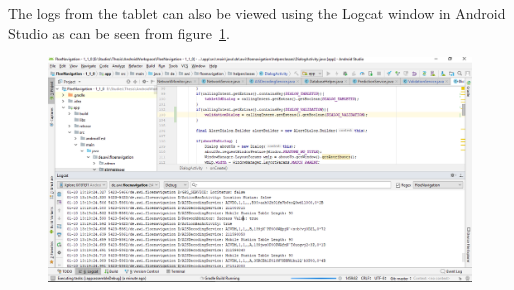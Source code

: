 \newline
\noindent
The logs from the tablet can also be viewed using the Logcat window in Android Studio as can be seen from figure~\ref{fig:CH6LogcatOverBluetooth}.
\begin{figure}[h]
	\centering
	\includegraphics[height=0.3\textheight]{fig06/logcatOverBluetooth.png}
	\label{fig:CH6LogcatOverBluetooth}
\end{figure}  